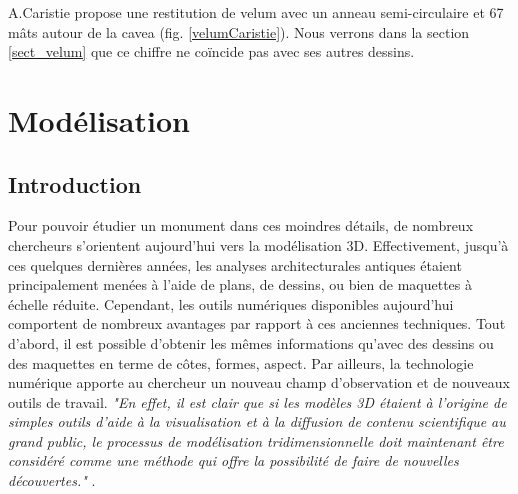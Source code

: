 		A.Caristie propose une restitution de \gls{velum} avec un anneau semi-circulaire et 67 mâts autour de la \gls{cavea} (fig. \ref{velumCaristie}). Nous verrons dans la section \ref{sect_velum} que ce chiffre ne coïncide pas avec ses autres dessins.
		














\chapter{Modélisation}
		\minitoc
		\newpage
		
		\section*{Introduction}
		Pour pouvoir étudier un monument dans ces moindres détails, de nombreux chercheurs s'orientent aujourd'hui vers la modélisation 3D. Effectivement, jusqu'à ces quelques dernières années, les analyses architecturales antiques étaient principalement menées à l'aide de plans, de dessins, ou bien de maquettes à échelle réduite. Cependant, les outils numériques disponibles aujourd'hui comportent de nombreux avantages par rapport à ces anciennes techniques. Tout d'abord, il est possible d'obtenir les mêmes informations qu'avec des dessins ou des maquettes en terme de côtes, formes, aspect. Par ailleurs, la technologie numérique apporte au chercheur un nouveau champ d'observation et de nouveaux outils de travail. \textit{"En effet, il est clair que si les modèles 3D étaient à l’origine de simples outils d’aide à la visualisation et à la diffusion de contenu scientifique au grand public, le processus de modélisation tridimensionnelle doit maintenant être considéré comme une méthode qui offre la possibilité de faire de nouvelles découvertes."} \cite[p. 246]{rocheleau}.
		
